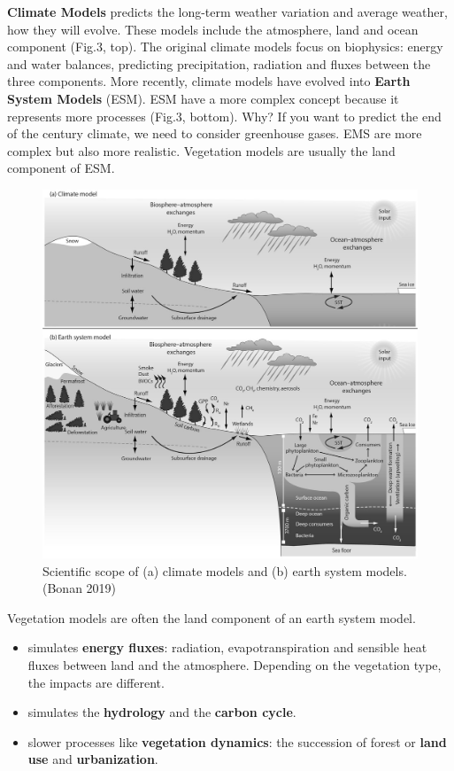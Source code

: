 \documentclass[12pt,oneside]{book}
\providecommand{\tightlist}{%
  \setlength{\itemsep}{0pt}\setlength{\parskip}{0pt}}
\begin{document}
\textbf{Climate Models} predicts the long-term weather variation and
average weather, how they will evolve. These models include the
atmosphere, land and ocean component (Fig.3, top). The original climate
models focus on biophysics: energy and water balances, predicting
precipitation, radiation and fluxes between the three components. More
recently, climate models have evolved into \textbf{Earth System Models}
(ESM). ESM have a more complex concept because it represents more
processes (Fig.3, bottom). Why? If you want to predict the end of the
century climate, we need to consider greenhouse gases. EMS are more
complex but also more realistic. Vegetation models are usually the land
component of ESM.

\begin{figure}

{\centering \includegraphics[width=0.8\linewidth]{figures/chap1/GCM_ESM} 

}

\caption{Scientific scope of (a) climate models and (b) earth system models. (Bonan 2019)}\label{fig:f3}
\end{figure}

Vegetation models are often the land component of an earth system model.

\begin{itemize}
\tightlist
\item
  simulates \textbf{energy fluxes}: radiation, evapotranspiration and
  sensible heat fluxes between land and the atmosphere. Depending on the
  vegetation type, the impacts are different.
\item
  simulates the \textbf{hydrology} and the \textbf{carbon cycle}.
\item
  slower processes like \textbf{vegetation dynamics}: the succession of
  forest or \textbf{land use} and \textbf{urbanization}.
\end{itemize}
\end{document}
